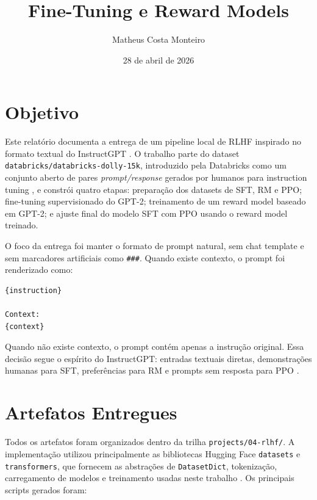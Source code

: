 \documentclass[a4paper,12pt]{article}
\begin{document}
\title{Fine-Tuning e Reward Models}
\author{Matheus Costa Monteiro}
\date{28 de abril de 2026}

\section{Objetivo}

Este relatório documenta a entrega de um pipeline local de RLHF inspirado no formato textual do InstructGPT \cite{ouyang2022training}. O trabalho parte do dataset \texttt{databricks/databricks-dolly-15k}, introduzido pela Databricks como um conjunto aberto de pares \textit{prompt/response} gerados por humanos para instruction tuning \cite{databricks2023dolly,databricksDolly15k}, e constrói quatro etapas: preparação dos datasets de SFT, RM e PPO; fine-tuning supervisionado do GPT-2; treinamento de um reward model baseado em GPT-2; e ajuste final do modelo SFT com PPO usando o reward model treinado.

O foco da entrega foi manter o formato de prompt natural, sem chat template e sem marcadores artificiais como \texttt{\#\#\#}. Quando existe contexto, o prompt foi renderizado como:

\begin{verbatim}
{instruction}

Context:
{context}
\end{verbatim}

Quando não existe contexto, o prompt contém apenas a instrução original. Essa decisão segue o espírito do InstructGPT: entradas textuais diretas, demonstrações humanas para SFT, preferências para RM e prompts sem resposta para PPO \cite{ouyang2022training}.

\section{Artefatos Entregues}

Todos os artefatos foram organizados dentro da trilha \texttt{projects/04-rlhf/}. A implementação utilizou principalmente as bibliotecas Hugging Face \texttt{datasets} e \texttt{transformers}, que fornecem as abstrações de \texttt{DatasetDict}, tokenização, carregamento de modelos e treinamento usadas neste trabalho \cite{lhoest2021datasets,wolf2020transformers}. Os principais scripts gerados foram:
\end{document}
